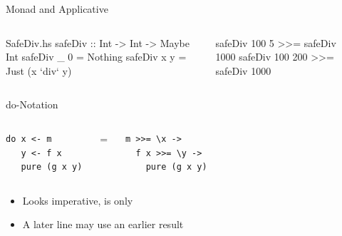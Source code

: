 \begin{frame}[fragile]{Monad and Applicative}
\begin{fullwidth}
\begin{columns}[c,onlytextwidth]
%
\begin{mhsfile}{SafeDiv.hs}
safeDiv :: Int -> Int -> Maybe Int
safeDiv _ 0 = Nothing
safeDiv x y = Just (x `div` y)
\end{mhsfile}
\begin{ghcisession}[start=2]
safeDiv 100 5 >>= safeDiv 1000
safeDiv 100 200 >>= safeDiv 1000
\end{ghcisession}
%
\\[4mm]
\\[2mm]
\end{columns}
\end{fullwidth}
\end{frame}
\mhsGhcUnload

\begin{frame}{do-Notation}
\begin{fullwidth}
\begin{columns}[c,onlytextwidth]
\begin{verbatim}
do x <- m
   y <- f x
   pure (g x y)
\end{verbatim}
\centering\(=\)
\begin{verbatim}
m >>= \x ->
  f x >>= \y ->
    pure (g x y)
\end{verbatim}
\end{columns}
\vspace{4mm}
\begin{itemize}
   \item<2-> Looks imperative, is only \ihs{>>=}
   \item<3-> A later line may use an earlier result
\end{itemize}
\end{fullwidth}
\end{frame}


